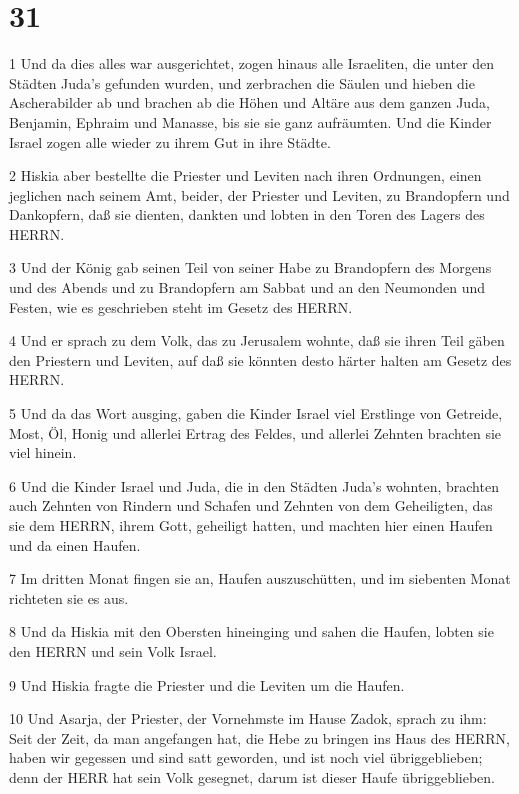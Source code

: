 \chapter{31}

\par 1 Und da dies alles war ausgerichtet, zogen hinaus alle Israeliten, die unter den Städten Juda's gefunden wurden, und zerbrachen die Säulen und hieben die Ascherabilder ab und brachen ab die Höhen und Altäre aus dem ganzen Juda, Benjamin, Ephraim und Manasse, bis sie sie ganz aufräumten. Und die Kinder Israel zogen alle wieder zu ihrem Gut in ihre Städte.
\par 2 Hiskia aber bestellte die Priester und Leviten nach ihren Ordnungen, einen jeglichen nach seinem Amt, beider, der Priester und Leviten, zu Brandopfern und Dankopfern, daß sie dienten, dankten und lobten in den Toren des Lagers des HERRN.
\par 3 Und der König gab seinen Teil von seiner Habe zu Brandopfern des Morgens und des Abends und zu Brandopfern am Sabbat und an den Neumonden und Festen, wie es geschrieben steht im Gesetz des HERRN.
\par 4 Und er sprach zu dem Volk, das zu Jerusalem wohnte, daß sie ihren Teil gäben den Priestern und Leviten, auf daß sie könnten desto härter halten am Gesetz des HERRN.
\par 5 Und da das Wort ausging, gaben die Kinder Israel viel Erstlinge von Getreide, Most, Öl, Honig und allerlei Ertrag des Feldes, und allerlei Zehnten brachten sie viel hinein.
\par 6 Und die Kinder Israel und Juda, die in den Städten Juda's wohnten, brachten auch Zehnten von Rindern und Schafen und Zehnten von dem Geheiligten, das sie dem HERRN, ihrem Gott, geheiligt hatten, und machten hier einen Haufen und da einen Haufen.
\par 7 Im dritten Monat fingen sie an, Haufen auszuschütten, und im siebenten Monat richteten sie es aus.
\par 8 Und da Hiskia mit den Obersten hineinging und sahen die Haufen, lobten sie den HERRN und sein Volk Israel.
\par 9 Und Hiskia fragte die Priester und die Leviten um die Haufen.
\par 10 Und Asarja, der Priester, der Vornehmste im Hause Zadok, sprach zu ihm: Seit der Zeit, da man angefangen hat, die Hebe zu bringen ins Haus des HERRN, haben wir gegessen und sind satt geworden, und ist noch viel übriggeblieben; denn der HERR hat sein Volk gesegnet, darum ist dieser Haufe übriggeblieben.
